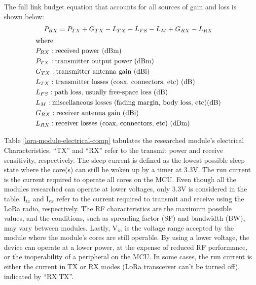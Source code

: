 The full link budget equation that accounts for all sources of gain and loss is
shown below:
\begin{gather}\label{eq-link-budget-full}
P_{RX} = P_{TX} + G_{TX} - L_{TX} - L_{FS} - L_M + G_{RX} - L_{RX} \\
\intertext{where}
\begin{aligned}
& P_{RX}: \text{received power (dBm)} \\
& P_{TX}: \text{transmitter output power (dBm)} \\
& G_{TX}: \text{transmitter antenna gain (dBi)} \\
& L_{TX}: \text{transmitter losses (coax, connectors, etc) (dB)} \\
& L_{FS}: \text{path loss, usually free-space loss (dB)} \\
& L_{M}: \text{miscellaneous losses (fading margin, body loss, etc)(dB)} \\
& G_{RX}: \text{receiver antenna gain (dBi)} \\
& L_{RX}: \text{receiver losses (coax, connectors, etc) (dBm)} \\
\end{aligned}\notag
\end{gather}

Table \ref{lora-module-electrical-comp} tabulates the researched module's electrical
Characteristics. ``TX'' and ``RX'' refer to the transmit power and receive
sensitivity, respectively. The sleep current is defined as the lowest possible
sleep state where the core(s) can still be woken up by a timer at 3.3V. The run
current is the current required to operate all cores on the MCU. Even though all
the modules researched can operate at lower voltages, only 3.3V is considered in
the table. I$_{tx}$ and I$_{rx}$ refer to the current required to transmit and
receive using the LoRa radio, respectively.  The RF characteristics are the
maximum possible values, and the conditions, such as spreading factor (SF) and
bandwidth (BW), may vary between modules.  Lastly, V$_{in}$ is the voltage range
accepted by the module where the module's cores are still operable. By using a
lower voltage, the device can operate at a lower power, at the expense of
reduced RF performance, or the inoperability of a peripheral on the MCU. In some
cases, the run current is either the current in TX or RX modes (LoRa transceiver
can't be turned off), indicated by ``RX|TX''.


